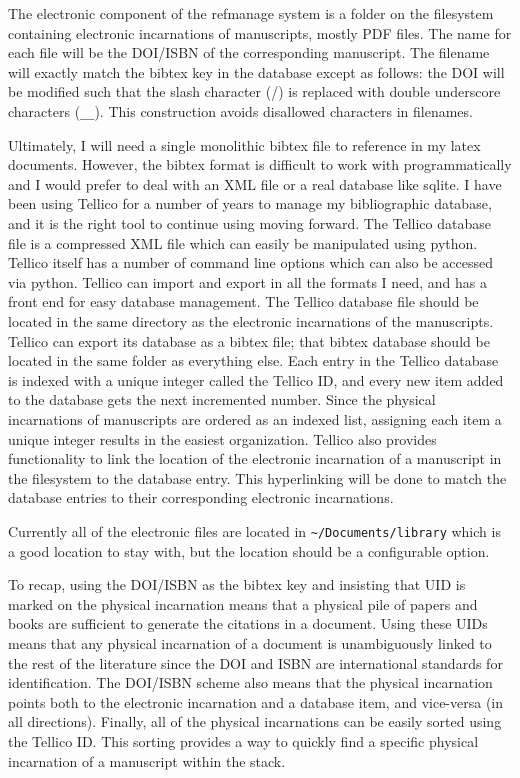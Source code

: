 \documentclass[letterpaper,12pt]{article}
\begin{document}
The electronic component of the refmanage system is a folder on the filesystem containing electronic incarnations of manuscripts, mostly PDF files. The name for each file will be the DOI/ISBN of the corresponding manuscript. The filename will exactly match the bibtex key in the database except as follows: the DOI will be modified such that the slash character (/) is replaced with double underscore characters (\verb|__|). This construction avoids disallowed characters in filenames.

Ultimately, I will need a single monolithic bibtex file to reference in my latex documents. However, the bibtex format is difficult to work with programmatically and I would prefer to deal with an XML file or a real database like sqlite. I have been using Tellico for a number of years to manage my bibliographic database, and it is the right tool to continue using moving forward. The Tellico database file is a compressed XML file which can easily be manipulated using python. Tellico itself has a number of command line options which can also be accessed via python. Tellico can import and export in all the formats I need, and has a front end for easy database management. The Tellico database file should be located in the same directory as the electronic incarnations of the manuscripts. Tellico can export its database as a bibtex file; that bibtex database should be located in the same folder as everything else. Each entry in the Tellico database is indexed with a unique integer called the Tellico ID, and every new item added to the database gets the next incremented number. Since the physical incarnations of manuscripts are ordered as an indexed list, assigning each item a unique integer results in the easiest organization. Tellico also provides functionality to link the location of the electronic incarnation of a manuscript in the filesystem to the database entry. This hyperlinking will be done to match the database entries to their corresponding electronic incarnations.

Currently all of the electronic files are located in \verb|~/Documents/library| which is a good location to stay with, but the location should be a configurable option. 

To recap, using the DOI/ISBN as the bibtex key and insisting that UID is marked on the physical incarnation means that a physical pile of papers and books are sufficient to generate the citations in a document. Using these UIDs means that any physical incarnation of a document is unambiguously linked to the rest of the literature since the DOI and ISBN are international standards for identification. The DOI/ISBN scheme also means that the physical incarnation points both to the electronic incarnation and a database item, and vice-versa (in all directions). Finally, all of the physical incarnations can be easily sorted using the Tellico ID. This sorting provides a way to quickly find a specific physical incarnation of a manuscript within the stack.
\end{document}
